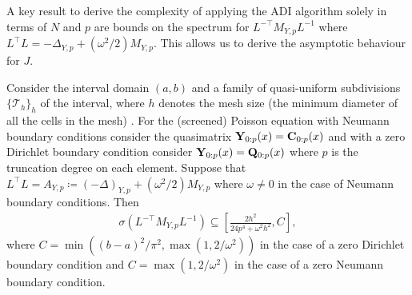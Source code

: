 \documentclass[hidelinks,onefignum,onetabnum]{siamart220329}
\begin{document}
A key result to derive the complexity of applying the ADI algorithm solely in terms of $N$ and $p$  are bounds on the spectrum for $L^{-\top} M_{Y,p} L^{-1}$ where $L^\top L = -\Delta_{Y,p} + (\omega^2/2) M_{Y,p}$. This allows us to derive the asymptotic behaviour for $J$.
\begin{lemma}[Spectrum]
\label{Lemma:eigs}
Consider the interval domain $(a,b)$ and a family of quasi-uniform subdivisions $\{\mathcal{T}_h\}_h$ of the interval, where $h$ denotes the mesh size (the minimum diameter of all the cells in the mesh) \cite[Def.~4.4.13]{Brenner2008}. For the (screened) Poisson equation with Neumann boundary conditions consider the quasimatrix ${\bf Y}_{0:p}(x) = {\bf C}_{0:p}(x)$ and with a zero Dirichlet boundary condition consider ${\bf Y}_{0:p}(x) = {\bf Q}_{0:p}(x)$ where $p$ is the truncation degree on each element. Suppose that $L^\top L = A_{Y,p} \coloneqq (-\Delta)_{Y,p} + (\omega^2/2) M_{Y,p}$ where $\omega \neq 0$ in the case of Neumann boundary conditions. Then
\begin{align}
\sigma(L^{-\top} M_{Y,p} L^{-1}) \subseteq \left[\frac{2 h^2}{24 p^{4} + \omega^2 h^2}, C \right],
\end{align}
where $C = \min( (b-a)^2/\pi^2, \max(1, 2/\omega^2))$ in the case of a zero Dirichlet boundary condition and $C = \max(1, 2/\omega^2)$ in the case of a zero Neumann boundary condition.
\end{lemma}
\end{document}
